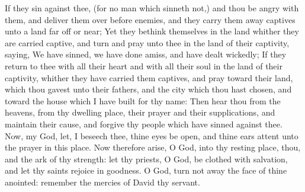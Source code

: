 {If they
sin against thee, (for
{} no
man which
sinneth not,) and thou be
angry with them, and
deliver them over
before
{}
enemies, and they carry them
away
captives unto a
land far
off or
near;
Yet
{} they
bethink themselves in the
land whither they are carried
captive, and
turn and
pray unto thee in the
land of their
captivity,
saying, We have
sinned, we have done
amiss, and have dealt
wickedly;
If they
return to thee with all their
heart and with all their
soul in the
land of their
captivity, whither they have carried them
captives, and
pray
toward their
land, which thou
gavest unto their
fathers, and
{} the
city which thou hast
chosen, and toward the
house which I have
built for thy
name:
Then
hear thou from the
heavens,
{} from thy
dwelling
place, their
prayer and their
supplications, and
maintain their
cause, and
forgive thy
people which have
sinned against thee.
Now, my
God, let, I beseech thee, thine
eyes be
open, and
{} thine
ears
{}
attent unto the
prayer
{} in this
place.
Now therefore
arise, O
{}
God, into thy
resting place, thou, and the
ark of thy
strength: let thy
priests, O
{}
God, be
clothed with
salvation, and let thy
saints
rejoice in
goodness.
O
{}
God, turn not
away the
face of thine
anointed:
remember the
mercies of
David thy
servant.

}
